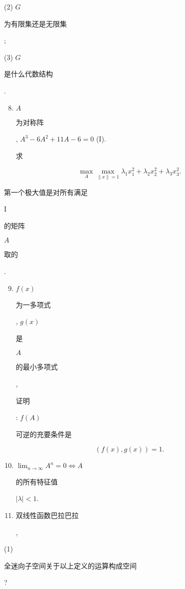 \documentclass[10pt]{article}
\begin{document}
(2) $G$ \begin{CJK}{UTF8}{mj}为有限集还是无限集\end{CJK};

(3) $G$ \begin{CJK}{UTF8}{mj}是什么代数结构\end{CJK}.

\begin{enumerate}
  \setcounter{enumi}{7}
  \item $A$ \begin{CJK}{UTF8}{mj}为对称阵\end{CJK}, $A^{3}-6 A^{2}+11 A-6=0$ (I). \begin{CJK}{UTF8}{mj}求\end{CJK}
\end{enumerate}
$$
\max _{A} \max _{\|x\|=1} \lambda_{1} x_{1}^{2}+\lambda_{2} x_{2}^{2}+\lambda_{3} x_{3}^{2} .
$$
\begin{CJK}{UTF8}{mj}第一个极大值是对所有满足\end{CJK} I \begin{CJK}{UTF8}{mj}的矩阵\end{CJK} $A$ \begin{CJK}{UTF8}{mj}取的\end{CJK}.

\begin{enumerate}
  \setcounter{enumi}{8}
  \item $f(x)$ \begin{CJK}{UTF8}{mj}为一多项式\end{CJK}, $g(x)$ \begin{CJK}{UTF8}{mj}是\end{CJK} $A$ \begin{CJK}{UTF8}{mj}的最小多项式\end{CJK}, \begin{CJK}{UTF8}{mj}证明\end{CJK}: $f(A)$ \begin{CJK}{UTF8}{mj}可逆的充要条件是\end{CJK}
\end{enumerate}
$$
(f(x), g(x))=1 .
$$

\begin{enumerate}
  \setcounter{enumi}{9}
  \item $\lim _{n \rightarrow \infty} A^{n}=0 \Longleftrightarrow A$ \begin{CJK}{UTF8}{mj}的所有特征值\end{CJK} $|\lambda|<1$.

  \item \begin{CJK}{UTF8}{mj}双线性函数巴拉巴拉\end{CJK},

\end{enumerate}
(1) \begin{CJK}{UTF8}{mj}全迷向子空间关于以上定义的运算构成空间\end{CJK}?
\end{document}
